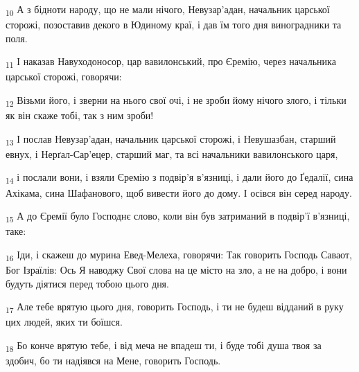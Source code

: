 \begin{tcolorbox}
\textsubscript{10} А з бідноти народу, що не мали нічого, Невузар'адан, начальник царської сторожі, позоставив декого в Юдиному краї, і дав їм того дня виноградники та поля.
\end{tcolorbox}
\begin{tcolorbox}
\textsubscript{11} І наказав Навуходоносор, цар вавилонський, про Єремію, через начальника царської сторожі, говорячи:
\end{tcolorbox}
\begin{tcolorbox}
\textsubscript{12} Візьми його, і зверни на нього свої очі, і не зроби йому нічого злого, і тільки як він скаже тобі, так з ним зроби!
\end{tcolorbox}
\begin{tcolorbox}
\textsubscript{13} І послав Невузар'адан, начальник царської сторожі, і Невушазбан, старший евнух, і Нерґал-Сар'ецер, старший маг, та всі начальники вавилонського царя,
\end{tcolorbox}
\begin{tcolorbox}
\textsubscript{14} і послали вони, і взяли Єремію з подвір'я в'язниці, і дали його до Ґедалії, сина Ахікама, сина Шафанового, щоб вивести його до дому. І осівся він серед народу.
\end{tcolorbox}
\begin{tcolorbox}
\textsubscript{15} А до Єремії було Господнє слово, коли він був затриманий в подвір'ї в'язниці, таке:
\end{tcolorbox}
\begin{tcolorbox}
\textsubscript{16} Іди, і скажеш до мурина Евед-Мелеха, говорячи: Так говорить Господь Саваот, Бог Ізраїлів: Ось Я наводжу Свої слова на це місто на зло, а не на добро, і вони будуть діятися перед тобою цього дня.
\end{tcolorbox}
\begin{tcolorbox}
\textsubscript{17} Але тебе врятую цього дня, говорить Господь, і ти не будеш відданий в руку цих людей, яких ти боїшся.
\end{tcolorbox}
\begin{tcolorbox}
\textsubscript{18} Бо конче врятую тебе, і від меча не впадеш ти, і буде тобі душа твоя за здобич, бо ти надіявся на Мене, говорить Господь.
\end{tcolorbox}
